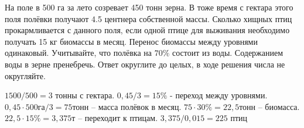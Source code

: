 
На поле в 500 га за лето созревает 450 тонн зерна. В тоже время с гектара этого поля полёвки получают 4.5 центнера 
собственной массы. Сколько хищных птиц прокармливается с данного поля, если одной птице для выживания необходимо получать 15 кг биомассы в месяц. Перенос биомассы между уровнями одинаковый. Учитывайте, что полёвка на $70\%$ состоит из воды. Содержанием воды в зерне пренебречь. Ответ округлите до целых, в ходе решения числа не округляйте.

\solutionSection

$1500/500 = 3$ тонны с гектара. $0,45/3 =15\%$ - переход между уровнями. \linebreak $0,45 \cdot 500 \text{га}/3=75$тонн – масса 
полёвок в месяц. $75 \cdot 30\%= 22,5$тонн – биомасса. $22,5 \cdot 15\% =3,375$т – переходит к птицам. 
$3,375/0,015=225$ птиц

